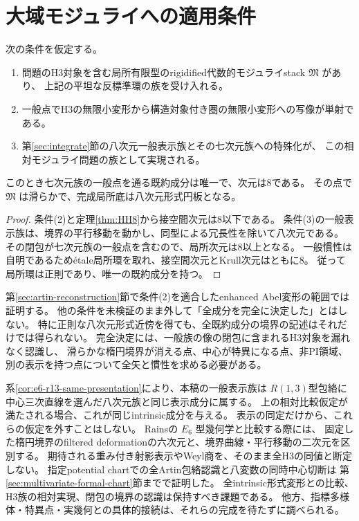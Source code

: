 \section{大域モジュライへの適用条件}\label{sec:component}
\begin{theorem}[相対モジュライ比較を明示した成分判定]\label{thm:conditional-component}
次の条件を仮定する。
\begin{enumerate}
\item 問題のH3対象を含む局所有限型のrigidified代数的モジュライstack $\mathfrak M$ があり、
上記の平坦な反標準環の族を受け入れる。
\item 一般点でH3の無限小変形から構造対象付き圏の無限小変形への写像が単射である。
\item 第\ref{sec:integrate}節の八次元一般表示族とその七次元族への特殊化が、
この相対モジュライ問題の族として実現される。
\end{enumerate}
このとき七次元族の一般点を通る既約成分は唯一で、次元は8である。
その点で $\mathfrak M$ は滑らかで、完成局所底は八次元形式円板となる。
\end{theorem}
\begin{proof}
条件(2)と定理\ref{thm:HH8}から接空間次元は8以下である。
条件(3)の一般表示族は、境界の平行移動を動かし、同型による冗長性を除いて八次元である。
その閉包が七次元族の一般点を含むので、局所次元は8以上となる。
一般慣性は自明であるため\'{e}tale局所環を取れ、接空間次元とKrull次元はともに8。
従って局所環は正則であり、唯一の既約成分を持つ。
\end{proof}

第\ref{sec:artin-reconstruction}節で条件(2)を適合したenhanced Abel変形の範囲では証明する。
他の条件を未検証のまま外して「全成分を完全に決定した」とはしない。
特に正則な八次元形式近傍を得ても、全既約成分の境界の記述はそれだけでは得られない。
完全決定には、一般族の像の閉包に含まれるH3対象を漏れなく認識し、
滑らかな楕円境界が消える点、中心が特異になる点、非PI領域、
別の表示を持つ点について全矢と慣性を求める必要がある。

系\ref{cor:e6-r13-same-presentation}により、本稿の一般表示族は
$R(1,3)$型包絡に中心三次直線を選んだ八次元族と同じ表示成分に属する。
上の相対比較仮定が満たされる場合、これが同じintrinsic成分を与える。
表示の同定だけから、これらの仮定を外すことはしない。
Rainsの $E_6$ 型幾何学と比較する際には、
固定した楕円境界のfiltered deformationの六次元と、境界曲線・平行移動の二次元を区別する。
期待される重み付き射影表示やWeyl商を、そのまま全H3の同値と断定しない。
指定potential chartでの全Artin包絡認識と八変数の同時中心切断は
第\ref{sec:multivariate-formal-chart}節までで証明した。
全intrinsic形式変形との比較、H3族の相対実現、閉包の境界の認識は保持すべき課題である。
他方、指標多様体・特異点・実幾何との具体的接続は、それらの完成を待たずに調べられる。
